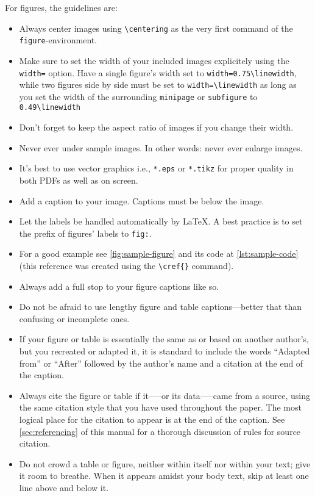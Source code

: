 For figures, the guidelines are:

\begin{itemize}
    \item Always center images using \verb|\centering| as the very first command of the \verb|figure|-environment.
    \item Make sure to set the width of your included images explicitely using the \verb|width=| option. Have a single figure's width set to \verb|width=0.75\linewidth|, while two figures side by side must be set to \verb|width=\linewidth| as long as you set the width of the surrounding \verb|minipage| or \verb|subfigure| to \verb|0.49\linewidth|
    \item Don't forget to keep the aspect ratio of images if you change their width.
    \item Never ever under sample images. In other words: never ever enlarge images.
    \item It's best to use vector graphics i.e., \verb|*.eps| or \verb|*.tikz| for proper quality in both PDFs as well as on screen.
    \item Add a caption to your image. Captions must be below the image.
    \item Let the labels be handled automatically by \LaTeX. A best practice is to set the prefix of figures' labels to \verb|fig:|.
    \item For a good example see \cref{fig:sample-figure} and its code at \cref{lst:sample-code} (this reference was created using the \verb|\cref{}| command).
    \item Always add a full stop to your figure captions like so.
    \item Do not be afraid to use lengthy figure and table captions—better that than confusing or incomplete ones.
    \item If your figure or table is essentially the same as or based on another author’s, but you recreated or adapted it, it is standard to include the words “Adapted from” or “After” followed by the author’s name and a citation at the end of the caption.
    \item Always cite the figure or table if it—--or its data—--came from a source, using the same citation style that you have used throughout the paper. The most logical place for the citation to appear is at the end of the caption. See \cref{sec:referencing} of this manual for a thorough discussion of rules for source citation.
    \item Do not crowd a table or figure, neither within itself nor within your text; give it room to breathe. When it appears amidst your body text, skip at least one line above and below it.

\end{itemize}
